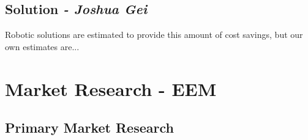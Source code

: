 \documentclass[11pt]{article}		%
\begin{document}
	\subsection[Solution]{Solution \textit{- Joshua Gei}}
	
	Robotic solutions are estimated to provide this amount of cost savings, but our own estimates are... 
	
    \section{Market Research - EEM}
        
        \subsection{Primary Market Research}
        
\end{document}
